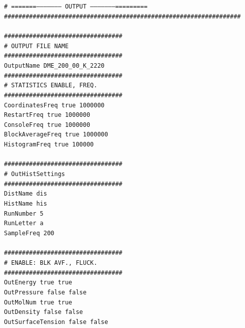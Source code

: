 \texttt{\#  =======-------------------- OUTPUT --------------------=========}\\
\texttt{\#\#\#\#\#\#\#\#\#\#\#\#\#\#\#\#\#\#\#\#\#\#\#\#\#\#\#\#\#\#\#\#\#\#\#\#\#\#\#\#\#\#\#\#\#\#\#\#\#\#\#\#\#\#\#\#\#\#\#\#\#\#\#\#\#\#}\\
\texttt{}\\
\texttt{\#\#\#\#\#\#\#\#\#\#\#\#\#\#\#\#\#\#\#\#\#\#\#\#\#\#\#\#\#\#\#\#\#}\\
\texttt{\# OUTPUT FILE NAME }\\
\texttt{\#\#\#\#\#\#\#\#\#\#\#\#\#\#\#\#\#\#\#\#\#\#\#\#\#\#\#\#\#\#\#\#\#}\\
\texttt{OutputName  DME\_200\_00\_K\_2220}\\
\newpage
\texttt{\#\#\#\#\#\#\#\#\#\#\#\#\#\#\#\#\#\#\#\#\#\#\#\#\#\#\#\#\#\#\#\#\#}\\
\texttt{\# STATISTICS	ENABLE,	FREQ.}\\
\texttt{\#\#\#\#\#\#\#\#\#\#\#\#\#\#\#\#\#\#\#\#\#\#\#\#\#\#\#\#\#\#\#\#\#}\\
\texttt{CoordinatesFreq      true   1000000}\\
\texttt{RestartFreq	         true   1000000}\\
\texttt{ConsoleFreq            true   1000000}\\
\texttt{BlockAverageFreq   true   1000000}\\
\texttt{HistogramFreq         true   100000}\\
\texttt{}\\
\texttt{\#\#\#\#\#\#\#\#\#\#\#\#\#\#\#\#\#\#\#\#\#\#\#\#\#\#\#\#\#\#\#\#\#}\\
\texttt{\# OutHistSettings}\\
\texttt{\#\#\#\#\#\#\#\#\#\#\#\#\#\#\#\#\#\#\#\#\#\#\#\#\#\#\#\#\#\#\#\#\#}\\
\texttt{DistName	 dis}\\
\texttt{HistName	 his}\\
\texttt{RunNumber	 5}\\
\texttt{RunLetter	 a}\\
\texttt{SampleFreq	 200}\\
\texttt{}\\
\texttt{\#\#\#\#\#\#\#\#\#\#\#\#\#\#\#\#\#\#\#\#\#\#\#\#\#\#\#\#\#\#\#\#\#}\\
\texttt{\# ENABLE: BLK AVF., FLUCK.}\\
\texttt{\#\#\#\#\#\#\#\#\#\#\#\#\#\#\#\#\#\#\#\#\#\#\#\#\#\#\#\#\#\#\#\#\#}\\
\texttt{OutEnergy                 true    	true}\\
\texttt{OutPressure              false   	false}\\
\texttt{OutMolNum               true    	true}\\
\texttt{OutDensity                false   	false}\\
\texttt{OutSurfaceTension   false	false}\\
\newpage
